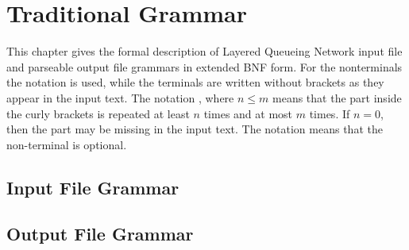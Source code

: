 
\chapter{Traditional Grammar}
\label{sec:old-grammar}

This chapter gives the formal description of Layered Queueing Network
input file and parseable output file grammars in extended BNF form.
For the nonterminals the notation  is used, while
the terminals are written without brackets as they appear in the input
text.  The notation , where $n \leq m$ means that
the part inside the curly brackets is repeated at least $n$ times and
at most $m$ times. If $n=0$, then the part may be missing in the input
text. The notation \opt{\nt{$\cdots$}} means that the non-terminal is
optional.

\section{Input File Grammar}
\label{sec:input-file-bnf}



\section{Output File Grammar}
\label{sec:output-file-bnf}


